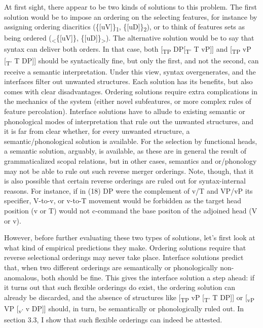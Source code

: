 \documentclass[output=paper
,modfonts
,nonflat]{langsci/langscibook}
\begin{document}
At first sight, there appear to be two kinds of solutions to this problem. The first solution would be to impose an ordering on the selecting features, for instance by assigning ordering diacritics (\{[uV]\}\textsubscript{1}, \{[uD]\}\textsubscript{2}), or to think of features sets as being ordered (\textsubscript{<}\{[uV]\}, \{[uD]\}\textsubscript{>}). The alternative solution would be to say that syntax can deliver both orders. In that case, both [\textsubscript{TP} DP[\textsubscript{T’} T vP]] and [\textsubscript{TP} vP [\textsubscript{T’} T DP]] should be syntactically fine, but only the first, and not the second, can receive a semantic interpretation. Under this view, syntax overgenerates, and the interfaces filter out unwanted structures. Each solution has its benefits, but also comes with clear disadvantages. Ordering solutions require extra complications in the mechanics of the system (either novel subfeatures, or more complex rules of feature percolation). Interface solutions have to allude to existing semantic or phonological modes of interpretation that rule out the unwanted structures, and it is far from clear whether, for every unwanted structure, a semantic/phonological solution is available. For the selection by functional heads, a semantic solution, arguably, is available, as these are in general the result of grammaticalized scopal relations, but in other cases, semantics and or/phonology may not be able to rule out such reverse merger orderings. Note, though, that it is also possible that certain reverse orderings are ruled out for syntax-internal reasons. For instance, if in (18) DP were the complement of v/T and VP/vP its specifier, V-to-v, or v-to-T movement would be forbidden as the target head position (v or T) would not c-command the base positon of the adjoined head (V or v).

However, before further evaluating these two types of solutions, let’s first look at what kind of empirical predictions they make. Ordering solutions require that reverse selectional orderings may never take place. Interface solutions predict that, when two different orderings are semantically or phonologically non-anomalous, both should be fine. This gives the interface solution a step ahead: if it turns out that such flexible orderings do exist, the ordering solution can already be discarded, and the absence of structures like [\textsubscript{TP} vP [\textsubscript{T’} T DP]] or [\textsubscript{vP} VP [\textsubscript{v’} v DP]] should, in turn, be semantically or phonologically ruled out. In section 3.3, I show that such flexible orderings can indeed be attested.
\end{document}
